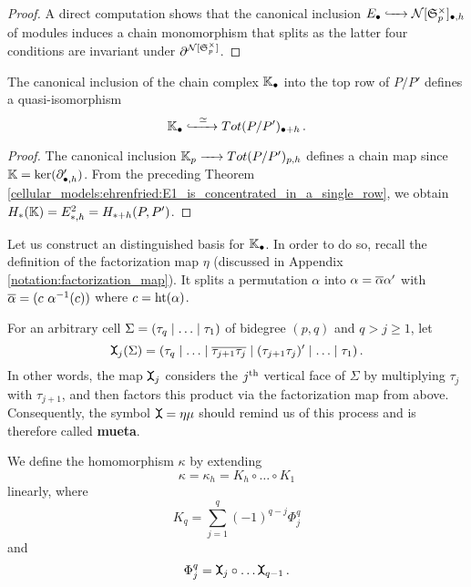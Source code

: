 \begin{proof}
A direct computation shows that the canonical inclusion $E_\bullet \xhookrightarrow{\hspace{6pt}{}\hspace{6pt}} \mathcal N[\mathfrak S^\times_p]_{\bullet,h}$ of modules induces a chain monomorphism that splits
as the latter four conditions are invariant under $\partial^{\mathcal N[\mathfrak S^\times_p]}$.
\end{proof}

\begin{cor}
    \label{cellular_models:ehrenfried:KK_is_qi_subcomplex}
    The canonical inclusion of the chain complex $\mathbb K_\bullet$ into the top row of $P/P'$ defines a quasi-isomorphism
    \[
        \mathbb K_\bullet \xhookrightarrow{\hspace{6pt}{\simeq}\hspace{6pt}} Tot(P/P')_{\bullet + h} \,.
    \]
\end{cor}

\begin{proof}
    The canonical inclusion $\mathbb K_p \xrightarrow{\hspace{6pt}{}\hspace{6pt}} Tot(P/P')_{p,h}$ defines a chain map since $\mathbb K = \ker( \partial'_{\bullet,h} )$.
    From the preceding Theorem \ref{cellular_models:ehrenfried:E1_is_concentrated_in_a_single_row}, we obtain
    $H_\ast(\mathbb K) = E^2_{\ast,h} = H_{\ast+h}(P,P')$.
\end{proof}

Let us construct an distinguished basis for $\mathbb K_\bullet$.
In order to do so, recall the definition of the factorization map $\eta$ (discussed in Appendix \ref{notation:factorization_map}).
It splits a permutation $\alpha$ into $\alpha = \overline \alpha \alpha'$ with $\overline \alpha = ( c\ \alpha^{-1}(c))$ where $c = \operatorname{ht}(\alpha)$.

\begin{defi}
    \label{cellular_models:ehrenfried:mueta}
    For an arbitrary cell $\Sigma = \inhomq$ of bidegree $(p,q)$ and $q > j \ge 1$, let
    \[
        \mueta_j (\Sigma) = (\tau_q \mid \ldots \mid \ov{\tau_{j+1}\tau_j} \mid (\tau_{j+1}\tau_j)' \mid \ldots \mid \tau_1) \,.
    \]
    In other words, the map $\mueta_j$ considers the $j^{\text{th}}$ vertical face of $\Sigma$ by multiplying $\tau_j$ with $\tau_{j+1}$,
    and then factors this product via the factorization map from above.
    Consequently, the symbol $\mueta = \eta\mu$ should remind us of this process and is therefore called {\bf mueta}.
\end{defi}

\begin{defi}
    \label{cellular_models:ehrenfried:definition_kappa}
    We define the homomorphism $\kappa$ by extending
    \[
        \kappa = \kappa_h = K_h \circ \ldots \circ K_1
    \]
    linearly, where
    \[
        K_q = \sum_{j=1}^q (-1)^{q-j} \Phi_{j}^q
    \]
    and
    \[
        \Phi_j^q = \mueta_j \circ \ldots \mueta_{q-1} \,.
    \]
\end{defi}

